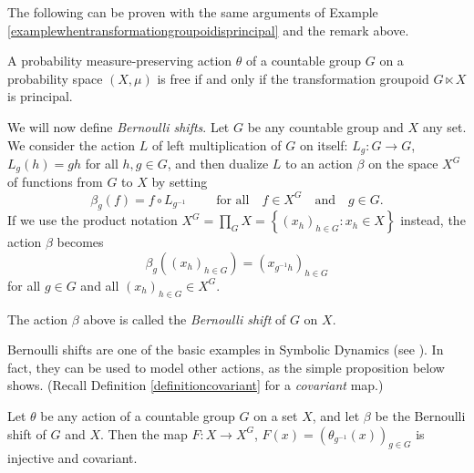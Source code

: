 The following can be proven with the same arguments of Example \ref{examplewhentransformationgroupoidisprincipal} and the remark above.

\begin{proposition}
A probability measure-preserving action $\theta$ of a countable group $G$ on a probability space $(X,\mu)$ is free if and only if the transformation groupoid $G\ltimes X$ is principal.
\end{proposition}

We will now define \emph{Bernoulli shifts}. Let $G$ be any countable group and $X$ any set. We consider the action $L$ of left multiplication of $G$ on itself: $L_g:G\to G$, $L_g(h)=gh$ for all $h,g\in G$, and then dualize $L$ to an action $\beta$ on the space $X^G$ of functions from $G$ to $X$ by setting
\[\beta_g(f)=f\circ L_{g^{-1}}\qquad\text{ for all}\quad f\in X^G\quad\text{and}\quad g\in G.\]
If we use the product notation $X^G=\prod_G X=\left\{(x_h)_{h\in G}:x_h\in X\right\}$ instead, the action $\beta$ becomes
\[\beta_g\left((x_h)_{h\in G}\right)=\left(x_{g^{-1}h}\right)_{h\in G}\]
for all $g\in G$ and all $(x_h)_{h\in G}\in X^G$.

\begin{definition}
The action $\beta$ above is called the \emph{Bernoulli shift} of $G$ on $X$.
\end{definition}

Bernoulli shifts are one of the basic examples in Symbolic Dynamics (see \cite{MR1222644}). In fact, they can be used to model other actions, as the simple proposition below shows. (Recall Definition \ref{definitioncovariant} for a \emph{covariant} map.)

\begin{proposition}
Let $\theta$ be any action of a countable group $G$ on a set $X$, and let $\beta$ be the Bernoulli shift of $G$ and $X$. Then the map $F:X\to X^G$, $F(x)=(\theta_{g^{-1}}(x))_{g\in G}$ is injective and covariant.
\end{proposition}

